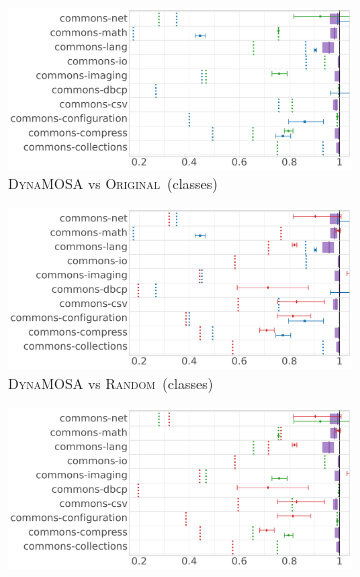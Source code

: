 \documentclass[sigconf]{acmart}
\newcommand{\original}{\textsc{Original}\xspace}
\newcommand{\EvosuiteRandom}{\textsc{Random}\xspace}
\newcommand{\EvosuiteDynamosa}{\textsc{DynaMOSA}\xspace}
\begin{document}
\begin{figure}
\begin{subfigure}{.43\textwidth}
    \centering
      \includegraphics[width=0.95\linewidth]{chaoplots/4/Chao-classes-dynamosa-organic.pdf}
  \caption{\textcolor{cdynamosa}\EvosuiteDynamosa vs \textcolor{coriginal}\original~(classes)}
\label{fig:ac}
\end{subfigure}
\hfill
\begin{subfigure}{.28\textwidth}
    \centering
      \includegraphics[width=0.95\linewidth,trim=12.8cm 0cm 0cm 0cm, clip=true]{chaoplots/4/Chao-classes-dynamosa-random.pdf}
  \caption{\textcolor{cdynamosa}\EvosuiteDynamosa vs \textcolor{crandom}\EvosuiteRandom~(classes)}
\label{fig:bc}
\end{subfigure}
\begin{subfigure}{.28\textwidth}
    \centering
      \includegraphics[width=0.95\linewidth,trim=12.8cm 0cm 0cm 0cm, clip=true]{chaoplots/4/Chao-classes-organic-random.pdf}

\end{subfigure}
\end{figure}
\end{document}
